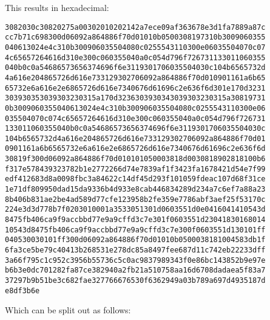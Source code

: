 This results in hexadecimal:

\begin{changemargin}{-60mm}{0mm}
\begin{myquote}
\begin{verbatim}
3082030c30820275a00302010202142a7ece09af363678e3d1fa7889a87c
cc7b71c698300d06092a864886f70d01010b0500308197310b3009060355
040613024e4c310b300906035504080c0255543110300e06035504070c07
4c65657264616d310e300c060355040a0c054d796f726731133011060355
040b0c0a54686573656374696f6e3119301706035504030c104b6565732d
4a616e204865726d616e733129302706092a864886f70d010901161a6b65
65732e6a616e2e6865726d616e7340676d61696c2e636f6d301e170d3231
303930353039303230315a170d3236303930343039303230315a30819731
0b3009060355040613024e4c310b300906035504080c0255543110300e06
035504070c074c65657264616d310e300c060355040a0c054d796f726731
133011060355040b0c0a54686573656374696f6e3119301706035504030c
104b6565732d4a616e204865726d616e733129302706092a864886f70d01
0901161a6b6565732e6a616e2e6865726d616e7340676d61696c2e636f6d
30819f300d06092a864886f70d010101050003818d0030818902818100b6
f317e578439323782b1e2772266d74e7839af1f3423fa1678421d54e7f99
edf412683d8a0098fbc3a84622c14df45d293f101059fdeac107d68f31ce
1e71df809950dad15da9336b4d933e8cab446834289d234a7c6ef7a88a23
8b406b831ae2be4ad589d77cfe123958b2fe359e7786abf3aef25f53170c
224e3d3d778b7f0203010001a3533051301d0603551d0e0416041410543d
8475fb406ca9f9accbbd77e9a9cffd3c7e301f0603551d23041830168014
10543d8475fb406ca9f9accbbd77e9a9cffd3c7e300f0603551d130101ff
040530030101ff300d06092a864886f70d01010b0500038181004583db1f
6fa3ce5be79c40413b268531e278dc85a8497fee687d11c742eb22233dff
3a66f795c1c952c3956b55736c5c0ac9837989343f0e86bc143852b9e97e
b6b3e0dc701282fa87ce382940a2fb21a510758aa16d6708dadaea5f83a7
37297b9b51be3c682fae327766676530f6362949a03b789a697d4935187d
e8df3b6e
\end{verbatim}
\end{myquote}
\end{changemargin}
Which can be split out as follows:
